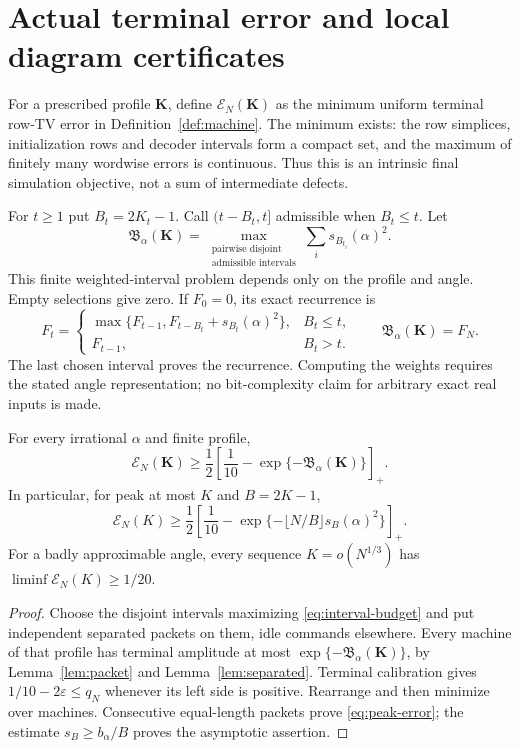 \section{Actual terminal error and local diagram certificates}\label{sec:error}
For a prescribed profile $\mathbf K$, define
$\mathcal E_N(\mathbf K)$ as the minimum uniform terminal row-TV error
in Definition~\ref{def:machine}. The minimum exists: the row simplices,
initialization rows and decoder intervals form a compact set, and the
maximum of finitely many wordwise errors is continuous. Thus this is an
intrinsic final simulation objective, not a sum of intermediate defects.

For $t\ge1$ put $B_t=2K_t-1$. Call $(t-B_t,t]$ admissible when
$B_t\le t$. Let
\begin{equation}\label{eq:interval-budget}
 \mathfrak B_\alpha(\mathbf K)
 =\max_{\substack{\text{pairwise disjoint}\\\text{admissible intervals}}}
                 \sum_i s_{B_{t_i}}(\alpha)^2.
\end{equation}
This finite weighted-interval problem depends only on the profile and
angle. Empty selections give zero. If $F_0=0$, its exact recurrence is
\[
 F_t=\begin{cases}
 \max\{F_{t-1},F_{t-B_t}+s_{B_t}(\alpha)^2\},&B_t\le t,\\
 F_{t-1},&B_t>t.
 \end{cases}
 \qquad \mathfrak B_\alpha(\mathbf K)=F_N.
\]
The last chosen interval proves the recurrence. Computing the weights
requires the stated angle representation; no bit-complexity claim for
arbitrary exact real inputs is made.

\begin{theorem}\label{thm:final-error}
For every irrational $\alpha$ and finite profile,
\begin{equation}\label{eq:error-bound}
 \mathcal E_N(\mathbf K)\ge\frac12
       \left[\frac1{10}-\exp\{-\mathfrak B_\alpha(\mathbf K)\}\right]_+.
\end{equation}
In particular, for peak at most $K$ and $B=2K-1$,
\begin{equation}\label{eq:peak-error}
 \mathcal E_N(K)\ge\frac12
       \left[\frac1{10}-\exp\{-\lfloor N/B\rfloor s_B(\alpha)^2\}\right]_+.
\end{equation}
For a badly approximable angle, every sequence $K=o(N^{1/3})$ has
$\liminf\mathcal E_N(K)\ge1/20$.
\end{theorem}
\begin{proof}
Choose the disjoint intervals maximizing \eqref{eq:interval-budget} and
put independent separated packets on them, idle commands elsewhere.
Every machine of that profile has terminal amplitude at most
$\exp\{-\mathfrak B_\alpha(\mathbf K)\}$, by Lemma~\ref{lem:packet}
and Lemma~\ref{lem:separated}. Terminal calibration gives
$1/10-2\varepsilon\le q_N$ whenever its left side is positive.
Rearrange and then minimize over machines. Consecutive equal-length
packets prove \eqref{eq:peak-error}; the estimate
$s_B\ge b_\alpha/B$ proves the asymptotic assertion.
\end{proof}

